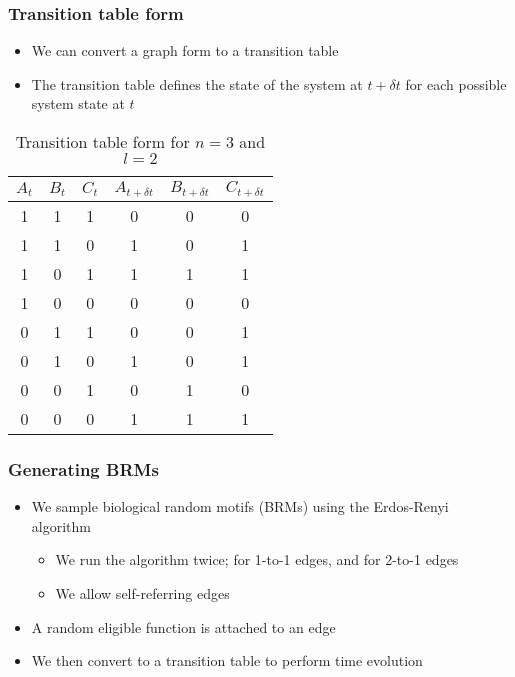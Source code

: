 \documentclass[hyperref={pdfpagelabels=false}]{beamer}
\begin{document}
\begin{frame}
\frametitle{Transition table form}
\begin{itemize}
\item We can convert a graph form to a transition table
\item The transition table defines the state of the system at $t + \delta t$ for each possible system state at $t$
\end{itemize}
\begin{table}[ht]
\begin{center}
\begin{tabular}{|c|c|c||c|c|c|}
\hline
$A_t$ & $B_t$ & $C_t$ & $A_{t+\delta t}$ & $B_{t+\delta t}$ & $C_{t+\delta t}$ \\
\hline
\hline
1 & 1 & 1 & 0 & 0 & 0 \\
1 & 1 & 0 & 1 & 0 & 1 \\
1 & 0 & 1 & 1 & 1 & 1 \\
1 & 0 & 0 & 0 & 0 & 0 \\
0 & 1 & 1 & 0 & 0 & 1 \\
0 & 1 & 0 & 1 & 0 & 1 \\
0 & 0 & 1 & 0 & 1 & 0 \\
0 & 0 & 0 & 1 & 1 & 1 \\
\hline
\end{tabular}
\end{center}
\caption{Transition table form for $n=3$ and $l=2$}
\end{table}
\end{frame}

\begin{frame}
\frametitle{Generating BRMs}
\begin{itemize}
\item We sample biological random motifs (BRMs) using the Erdos-Renyi algorithm \cite{margolin2006aracne}
\begin{itemize}
\item We run the algorithm twice; for 1-to-1 edges, and for 2-to-1 edges
\item We allow self-referring edges
\end{itemize}
\item A random eligible function is attached to an edge
\item We then convert to a transition table to perform time evolution
\end{itemize}
\end{frame}
\end{document}
